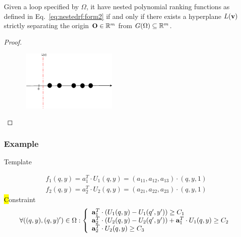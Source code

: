 \begin{frame}
\frametitle{}
\begin{myTheorem}
\label{thm:main}
	Given a loop specified by $\Omega$, it have nested polynomial ranking functions as defined in Eq.~\ref{eq:nestedrf:form2} if and only if there exists a hyperplane $L(\mathbf{v})$ strictly separating the origin $\mathbf{O} \in \mathbb{R}^{m}$ from $G(\Omega) \subseteq \mathbb{R}^{m}$.
\end{myTheorem}
\begin{proof}
\begin{figure}  %
  \includegraphics[width=5cm,height = 3cm]{pictures/proof}  
\end{figure}
\end{proof}
\end{frame}


\begin{frame}
\frametitle{Example}
Template 

\begin{align*}
f_1(q,y) = a_1^T \cdot U_1(q,y) = (a_{11},a_{12}, a_{13}) \cdot  (q,y,1)\\
f_2(q,y) = a_2^T \cdot U_2(q,y) = (a_{21},a_{22}, a_{23}) \cdot  (q,y,1)
\end{align*}
\hl

Constraint
\begin{equation}
\forall ((q,y),(q,y)') \in \Omega :
\left\{
	\begin{array}{ll}
		\mathbf{a}^{T}_{1} \cdot (U_{1}(q,y) - U_{1}(q',y')) \geq C_{1} \\
		\mathbf{a}^{T}_{2} \cdot (U_{2}(q,y) - U_{2}(q',y')) + \mathbf{a}^{T}_{1} \cdot U_{1}(q,y) \geq C_{2} \\
		\mathbf{a}^{T}_{2} \cdot U_{2}(q,y) \geq C_{3}
	\end{array}
\right. \notag
\end{equation}
\end{frame}

